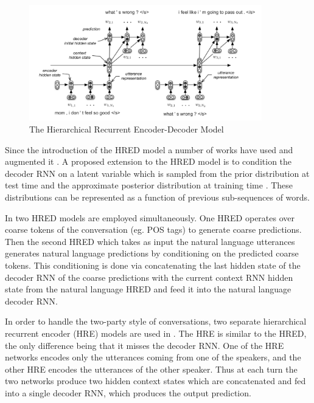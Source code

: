 \documentclass[12pt]{article}
\begin{document}
\begin{figure}[H]
	\centering
	\includegraphics[width=0.9\textwidth]{pics/HRED.png}
	\caption{The Hierarchical Recurrent Encoder-Decoder Model \cite{Serban:2015}}
	\label{fig:HRED}
\end{figure}
Since the introduction of the HRED model a number of works have used and augmented it \cite{Serban_VHRED:2017,Serban_MrRNN:2017,Serban:2017,Shen:2017,Li_adversarial:2017}. A proposed extension to the HRED model is to condition the decoder RNN on a latent variable which is sampled from the prior distribution at test time and the approximate posterior distribution at training time \cite{Serban_VHRED:2017}. These distributions can be represented as a function of previous sub-sequences of words. 

In \cite{Serban_MrRNN:2017} two HRED models are employed simultaneously. One HRED operates over coarse tokens of the conversation (eg. POS tags) to generate coarse predictions. Then the second HRED which takes as input the natural language utterances generates natural language predictions by conditioning on the predicted coarse tokens. This conditioning is done via concatenating the last hidden state of the decoder RNN of the coarse predictions with the current context RNN hidden state from the natural language HRED and feed it into the natural language decoder RNN.

In order to handle the two-party style of conversations, two separate hierarchical recurrent encoder (HRE) models are used in \cite{Shen:2017}. The HRE is similar to the HRED, the only difference being that it misses the decoder RNN. One of the HRE networks encodes only the utterances coming from one of the speakers, and the other HRE encodes the utterances of the other speaker. Thus at each turn the two networks produce two hidden context states which are concatenated and fed into a single decoder RNN, which produces the output prediction.
\end{document}
